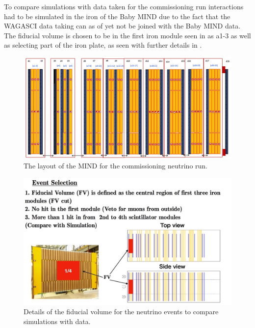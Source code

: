 To compare simulations with data taken for the commissioning run interactions had to be simulated in the iron of the Baby MIND due to the fact that the WAGASCI data taking can as of yet not be joined with the Baby MIND data. The fiducial volume is chosen to be in the first iron module seen in  as a1-3 as well as selecting part of the iron plate, as seen with further details in . 

\begin{figure}
\centering
\includegraphics[width=\textwidth]{figures/NeutrinoChap/NuFactTalk/Layout300118.jpeg}
\caption{The layout of the MIND for the commissioning neutrino run.}
\label{fig:MINDneutrinoLayout}
\end{figure}

\begin{figure}
\centering
\includegraphics[width=\textwidth]{figures/NeutrinoChap/NuFactTalk/eventRateCheck.jpeg}
\caption{Details of the fiducial volume for the neutrino events to compare simulations with data.}
\label{fig:MINDFiducial}
\end{figure}

